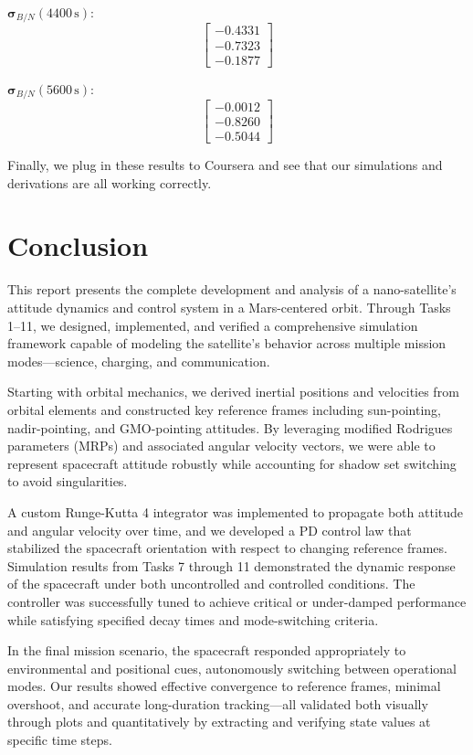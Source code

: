 \documentclass[conf]{new-aiaa}
\begin{document}
$\bm{\sigma}_{B/N}(4400\,\text{s})$:
\[
\begin{bmatrix}
-0.4331 \\
-0.7323 \\
-0.1877
\end{bmatrix}
\]

$\bm{\sigma}_{B/N}(5600\,\text{s})$:
\[
\begin{bmatrix}
-0.0012 \\
-0.8260 \\
-0.5044
\end{bmatrix}
\]

Finally, we plug in these results to Coursera and see that our simulations and derivations are all working correctly.

\section{Conclusion}
This report presents the complete development and analysis of a nano-satellite’s attitude dynamics and control system in a Mars-centered orbit. Through Tasks 1–11, we designed, implemented, and verified a comprehensive simulation framework capable of modeling the satellite’s behavior across multiple mission modes—science, charging, and communication. 

Starting with orbital mechanics, we derived inertial positions and velocities from orbital elements and constructed key reference frames including sun-pointing, nadir-pointing, and GMO-pointing attitudes. By leveraging modified Rodrigues parameters (MRPs) and associated angular velocity vectors, we were able to represent spacecraft attitude robustly while accounting for shadow set switching to avoid singularities.

A custom Runge-Kutta 4 integrator was implemented to propagate both attitude and angular velocity over time, and we developed a PD control law that stabilized the spacecraft orientation with respect to changing reference frames. Simulation results from Tasks 7 through 11 demonstrated the dynamic response of the spacecraft under both uncontrolled and controlled conditions. The controller was successfully tuned to achieve critical or under-damped performance while satisfying specified decay times and mode-switching criteria.

In the final mission scenario, the spacecraft responded appropriately to environmental and positional cues, autonomously switching between operational modes. Our results showed effective convergence to reference frames, minimal overshoot, and accurate long-duration tracking—all validated both visually through plots and quantitatively by extracting and verifying state values at specific time steps.
\end{document}
